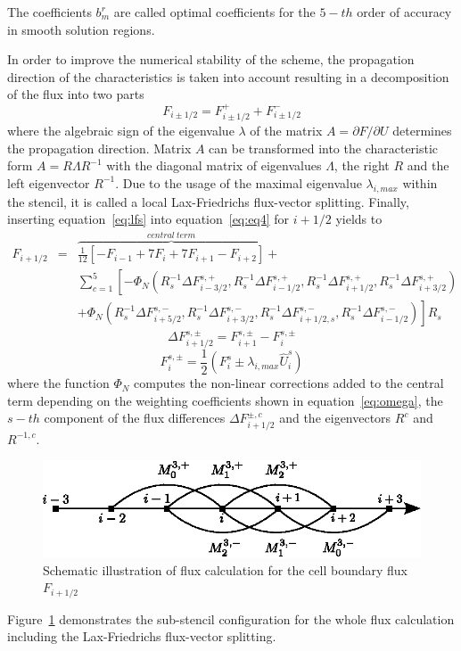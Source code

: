 The coefficients $b_m^r$ are called optimal coefficients for the $5-th$ order of accuracy in smooth solution regions.
\par
In order to improve the numerical stability of the scheme, the propagation direction of the characteristics is taken into account resulting in a decomposition of the flux into two parts
\begin{equation}
F_{i \pm 1/2}=F^{+}_{i \pm 1/2}+F^{-}_{i \pm 1/2}
\label{eq:lfs}
\end{equation}
where the algebraic sign of the eigenvalue $\lambda$ of the matrix $A=\partial F/ \partial U$ determines the propagation direction. 
Matrix $A$ can be transformed into the characteristic form $A=R\Lambda R^{-1}$ with the diagonal matrix of eigenvalues $\Lambda$, the right $R$ and the left eigenvector $R^{-1}$.
Due to the usage of the maximal eigenvalue $\lambda_{i,max}$ within the stencil, it is called a local Lax-Friedrichs flux-vector splitting.
Finally, inserting equation~\eqref{eq:lfs} into equation~\eqref{eq:eq4} for $i+1/2$ yields to
\begin{eqnarray}
F_{i+1/2}& =&\overbrace{\frac{1}{12}\left[ -F_{i-1}+7F_{i}+7F_{i+1}-F_{i+2} \right]}^{central\ term} + \nonumber \\
& &\sum_{c=1}^{5}\left[ -\Phi_N \left( 
R^{-1}_{s}\varDelta F^{s,+}_{i-3/2},
R^{-1}_{s} \varDelta F^{s,+}_{i-1/2},
R^{-1}_{s} \varDelta F^{s,+}_{i+1/2},
R^{-1}_{s} \varDelta F^{s,+}_{i+3/2}
\right) \right. \\
& &\left. +\Phi_N \left( 
R^{-1}_{s} \varDelta F^{s,-}_{i+5/2},
R^{-1}_{s} \varDelta F^{s,-}_{i+3/2},
R^{-1}_{s} \varDelta F^{s,-}_{i+1/2,s},
R^{-1}_{s} \varDelta F^{s,-}_{i-1/2}
\right) \right] R_{s} \nonumber
\end{eqnarray}
\begin{equation}
\varDelta F^{s,\pm}_{i+1/2}=F^{s,\pm}_{i+1}-F^{s,\pm}_{i}
\end{equation}
\begin{equation}
F^{s,\pm}_{i}=\frac{1}{2}\left(F^s_{i} \pm \lambda_{i,max} \hat{U}^s_{i} \right)
\end{equation}
where the function $\Phi_N$ computes the non-linear corrections added to the central term depending on the weighting coefficients shown in equation~\eqref{eq:omega}, the $s-th$ component of the flux differences $\varDelta F^{\pm,c}_{i+1/2}$ and the eigenvectors $R^c$ and $R^{-1,c}$.
\begin{figure}[!ht]
  \begin{center} 
    \includegraphics[width=0.5\linewidth]{stencil_weno5}
  \end{center}
  \caption {Schematic illustration of flux calculation for the cell boundary flux $F_{i + 1/2}$}
  \label{fig:fluxcalculation}
\end{figure}
Figure~\ref{fig:fluxcalculation} demonstrates the sub-stencil configuration for the whole flux calculation including the Lax-Friedrichs flux-vector splitting.

